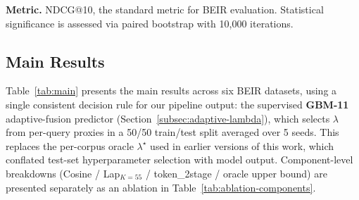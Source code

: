 \documentclass[review,1p]{elsarticle}
\begin{document}
\textbf{Metric.} NDCG@10, the standard metric for BEIR evaluation. Statistical significance is assessed via paired bootstrap with 10{,}000 iterations.

\subsection{Main Results}
\label{subsec:main-results}

Table~\ref{tab:main} presents the main results across six BEIR datasets, using a single consistent decision rule for our pipeline output: the supervised \textbf{GBM-11} adaptive-fusion predictor (Section~\ref{subsec:adaptive-lambda}), which selects $\lambda$ from per-query proxies in a 50/50 train/test split averaged over 5 seeds. This replaces the per-corpus oracle $\lambda^\star$ used in earlier versions of this work, which conflated test-set hyperparameter selection with model output. Component-level breakdowns (Cosine / Lap$_{K=55}$ / token\_2stage / oracle upper bound) are presented separately as an ablation in Table~\ref{tab:ablation-components}.
\end{document}
